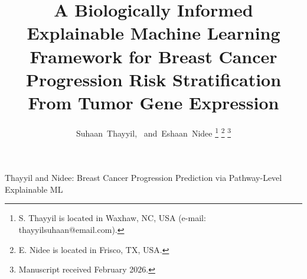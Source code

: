 \documentclass[journal]{IEEEtran}
\begin{document}
\title{A Biologically Informed Explainable Machine Learning Framework for Breast Cancer Progression Risk Stratification From Tumor Gene Expression}

\author{Suhaan~Thayyil,~%
        and~Eshaan~Nidee%
\thanks{S. Thayyil is located in Waxhaw, NC, USA (e-mail: thayyilsuhaan@email.com).}%
\thanks{E. Nidee is located in Frisco, TX, USA.}%
\thanks{Manuscript received February 2026.}}

%
{Thayyil and Nidee: Breast Cancer Progression Prediction via Pathway-Level Explainable ML}

\maketitle
\end{document}
